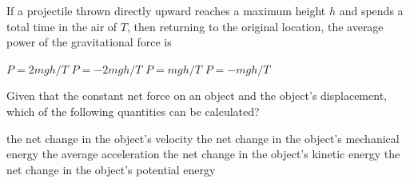 \documentclass{../../oss-apphys-exam}
\begin{document}


\raggedcolumns
\begin{multicols*}{2}
%
%    
  \begin{questions}
%    
    
    \question If a projectile thrown directly upward reaches a maximum height
    $h$ and spends a total time in the air of $T$, then returning to the
    original location, the average power of the gravitational force is
    \begin{choices}
      \choice $P=2mgh/T$
      \choice $P=-2mgh/T$
      \choice $P=mgh/T$
      \choice $P=-mgh/T$
    \end{choices}
    
    \question Given that the constant net force on an object and the object's 
    displacement, which of the following quantities can be calculated?
    \begin{choices}
      \choice the net change in the object's velocity
      \choice the net change in the object's mechanical energy
      \choice the average acceleration
      \choice the net change in the object's kinetic energy
      \choice the net change in the object's potential energy
    \end{choices}
    

\end{questions}
\end{multicols*}
\end{document}
